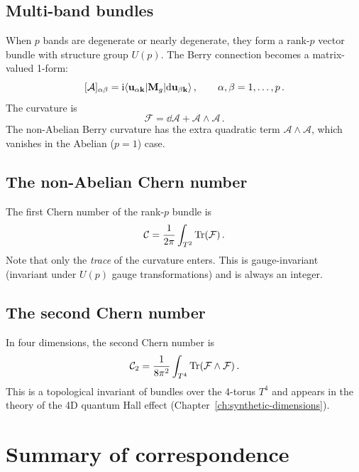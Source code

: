 \subsection{Multi-band bundles}
\label{sec:appB-multi-band}

When $p$ bands are degenerate or nearly degenerate, they form a
rank-$p$ vector bundle with structure group $U(p)$.  The Berry
connection becomes a matrix-valued 1-form:
\begin{equation}\label{eq:appB-na-connection}
  [\mathcal{A}]_{\alpha\beta}
  = \mathrm{i}\langle\mathbf{u}_{\alpha\mathbf{k}}|\mathbf{M}_g|
  \mathrm{d}\mathbf{u}_{\beta\mathbf{k}}\rangle\,,
  \qquad \alpha,\beta=1,\ldots,p\,.
\end{equation}
The curvature is
\begin{equation}\label{eq:appB-na-curvature}
  \mathcal{F} = \dd\mathcal{A}+\mathcal{A}\wedge\mathcal{A}\,.
\end{equation}
The non-Abelian Berry curvature has the extra quadratic term
$\mathcal{A}\wedge\mathcal{A}$, which vanishes in the Abelian
($p=1$) case.

\subsection{The non-Abelian Chern number}
\label{sec:appB-na-chern}

The first Chern number of the rank-$p$ bundle is
\begin{equation}\label{eq:appB-na-chern-formula}
  \mathcal{C} = \frac{1}{2\pi}\int_{T^2}\operatorname{Tr}(\mathcal{F})\,.
\end{equation}
Note that only the \emph{trace} of the curvature enters.  This is
gauge-invariant (invariant under $U(p)$ gauge transformations) and is
always an integer.

\subsection{The second Chern number}
\label{sec:appB-second-chern}

In four dimensions, the second Chern number is
\begin{equation}\label{eq:appB-second-chern}
  \mathcal{C}_2 = \frac{1}{8\pi^2}\int_{T^4}
  \operatorname{Tr}(\mathcal{F}\wedge\mathcal{F})\,.
\end{equation}
This is a topological invariant of bundles over the 4-torus $T^4$
and appears in the theory of the 4D quantum Hall effect
(Chapter~\ref{ch:synthetic-dimensions}).

\section{Summary of correspondence}
\label{sec:appB-summary}

